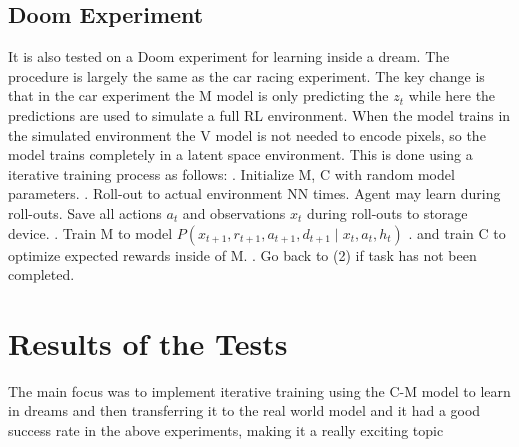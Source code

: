 \documentclass[a4paper]{article}
\begin{document}
\subsection{Doom Experiment}
It is also tested on a Doom experiment for learning inside a dream. The procedure is largely the same as the car racing experiment. The key change is that in the car experiment the M model is only predicting the $z_t$ while here the predictions are used to simulate a full RL environment. When the model trains in the simulated environment the V model is not needed to encode pixels, so the model trains completely in a latent space environment. This is done using a iterative training process as follows:
\newline
{}. 
Initialize M, C with random model parameters.
\newline
{}. 
Roll-out to actual environment NN times. Agent may learn during roll-outs. Save all actions $a_t$  and observations $x_t$  during roll-outs to storage device.
\newline
{}. 
Train M to model 
$P(x_{t+1}, r_{t+1}, a_{t+1}, d_{t+1} \; | \; x_t, a_t, h_t)$
\newline
{}. 
 and train C to optimize expected rewards inside of M.
 \newline
 . 
Go back to (2) if task has not been completed.
\section{Results of the Tests}
The main focus was to implement iterative training using the C-M model to learn in dreams and then transferring it to the real world model and it had a good success rate in the above experiments, making it a really exciting topic 
\newline
\printbibliography
\end{document}
